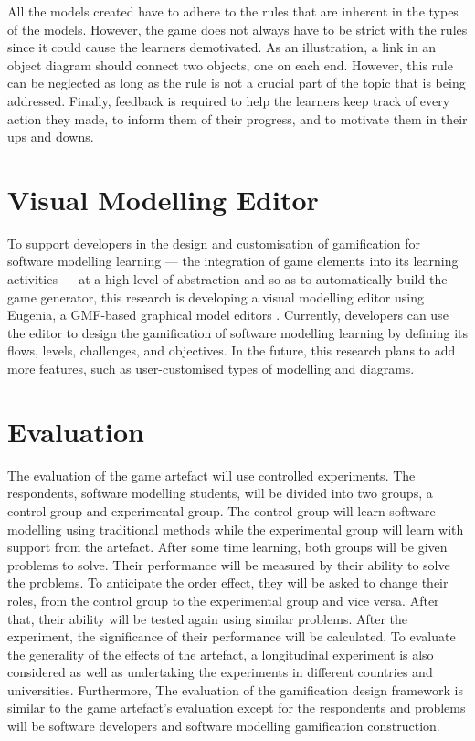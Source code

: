 \documentclass[runningheads,a4paper]{llncs}
\begin{document}
All the models created have to adhere to the rules that are inherent in the types of the models. However, the game does not always have to be strict with the rules since it could cause the learners demotivated. As an illustration, a link in an object diagram should connect two objects, one on each end. However, this rule can be neglected as long as the rule is not a crucial part of the topic that is being addressed. Finally, feedback is required to help the learners keep track of every action they made, to inform them of their progress, and to motivate them in their ups and downs.

\section{Visual Modelling Editor}
To support developers in the design and customisation of gamification for software modelling learning --- the integration of game elements into its learning activities --- at a high level of abstraction and so as to automatically build the game generator, this research is developing a visual modelling editor using Eugenia, a GMF-based graphical model editors \cite{kolovos2015eugenia}. Currently, developers can use the editor to design the gamification of software modelling learning by defining its flows, levels, challenges, and objectives. In the future, this research plans to add more features, such as user-customised types of modelling and diagrams. 

\section{Evaluation}
The evaluation of the game artefact will use controlled experiments. The respondents, software modelling students, will be divided into two groups, a control group and experimental group. The control group will learn software modelling using traditional methods while the experimental group will learn with support from the artefact. After some time learning, both groups will be given problems to solve. Their performance will be measured by their ability to solve the problems. To anticipate the order effect, they will be asked to change their roles, from the control group to the experimental group and vice versa. After that, their ability will be tested again using similar problems. After the experiment, the significance of their performance will be calculated. To evaluate the generality of the effects of the artefact, a longitudinal experiment is also considered as well as undertaking the experiments in different countries and universities. Furthermore, The evaluation of the gamification design framework is similar to the game artefact's evaluation except for the respondents and problems will be software developers and software modelling gamification construction.
\end{document}
